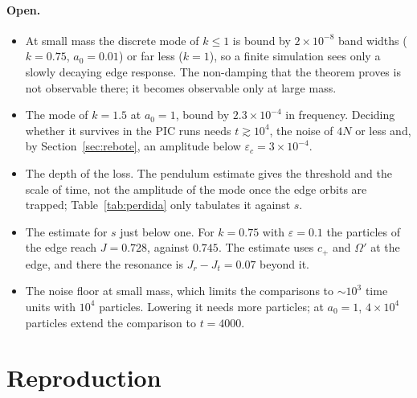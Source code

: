 \documentclass[11pt,a4paper]{article}
\begin{document}
\paragraph{Open.}
\begin{itemize}
\item At small mass the discrete mode of $k\le1$ is bound by $2\times10^{-8}$ band widths
($k=0.75$, $a_0=0.01$) or far less ($k=1$), so a finite simulation sees only a slowly decaying
edge response. The non-damping that the
theorem proves is not observable there; it becomes observable only at large mass.
\item The mode of $k=1.5$ at $a_0=1$, bound by $2.3\times10^{-4}$ in frequency. Deciding whether it
survives in the PIC runs needs $t\gtrsim10^4$, the noise of $4N$ or less and, by
Section~\ref{sec:rebote}, an amplitude below $\varepsilon_c=3\times10^{-4}$.
\item The depth of the loss. The pendulum estimate gives the threshold and the scale of time,
not the amplitude of the mode once the edge orbits are trapped; Table~\ref{tab:perdida} only
tabulates it against $s$.
\item The estimate for $s$ just below one. For $k=0.75$ with $\varepsilon=0.1$ the particles of
the edge reach $J=0.728$, against $0.745$. The estimate uses $c_+$ and $\Omega'$ at the edge,
and there the resonance is $J_r-J_t=0.07$ beyond it.
\item The noise floor at small mass, which limits the comparisons to $\sim10^3$ time units with
$10^4$ particles. Lowering it needs more particles; at $a_0=1$, $4\times10^4$ particles extend the
comparison to $t=4000$.
\end{itemize}

\section{Reproduction}
\label{sec:reproducir}
\end{document}
